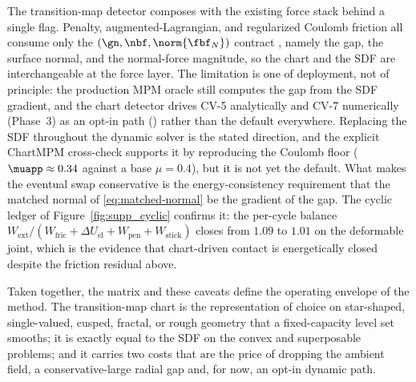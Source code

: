 The transition-map detector composes with the existing force stack behind a single flag. Penalty,
augmented-Lagrangian, and regularized Coulomb friction all consume only the $(\gn,\nbf,\norm{\fbf_N})$
contract \citep{kikuchi1988contact}, namely the gap, the surface normal, and the normal-force magnitude,
so the chart and the SDF are interchangeable at the force layer. The limitation is one of deployment, not of
principle: the production MPM oracle still computes the gap from the SDF gradient, and the chart detector
drives CV-5 analytically and CV-7 numerically (Phase~3) as an opt-in path ()
rather than the default everywhere. Replacing the SDF throughout the dynamic solver is the stated
direction, and the explicit ChartMPM cross-check supports it by reproducing the Coulomb floor
($\muapp\approx 0.34$ against a base $\mu=0.4$), but it is not yet the default. What makes the eventual
swap conservative is the energy-consistency requirement that the matched normal of
\eqref{eq:matched-normal} be the gradient of the gap. The cyclic ledger of
Figure~\ref{fig:supp_cyclic} confirms it: the per-cycle balance
$W_{\mathrm{ext}}/(W_{\mathrm{fric}}+\Delta U_{\mathrm{el}}+W_{\mathrm{pen}}+W_{\mathrm{stick}})$ closes
from $1.09$ to $1.01$ on the deformable joint, which is the evidence that chart-driven contact is
energetically closed despite the friction residual above.

Taken together, the matrix and these caveats define the operating envelope of the method. The
transition-map chart is the representation of choice on star-shaped, single-valued, cusped, fractal, or
rough geometry that a fixed-capacity level set smooths; it is exactly equal to the SDF on the convex and
superposable problems; and it carries two costs that are the price of dropping the ambient field, a
conservative-large radial gap and, for now, an opt-in dynamic path.
